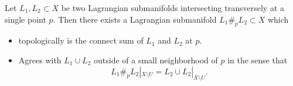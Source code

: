 
 
Let $L_1, L_2\subset X$ be two Lagrangian submanifolds intersecting transversely at a single point $p$. 
Then there exists a Lagrangian submanifold $L_1\#_p L_2\subset X$ which
\begin{itemize}
        \item topologically is the connect sum of $L_1$ and $L_2$ at $p$. 
        \item Agrees with $L_1\cup L_2$ outside of a small neighborhood of $p$ in the sense that 
        \[L_1\#_p L_2|_{X\setminus U}=L_2\cup L_2|_{X\setminus U}.\]
\end{itemize}
 